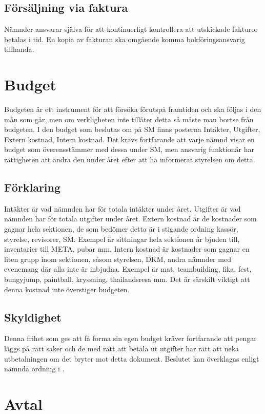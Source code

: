 \documentclass{dgovdoc}
\begin{document}
\subsection{Försäljning via faktura}
Nämnder ansvarar själva för att kontinuerligt kontrollera att utskickade fakturor betalas i tid. En kopia av
fakturan ska omgående komma bokföringsansvarig tillhanda.

\section{Budget}
Budgeten är ett instrument för att försöka förutspå framtiden och ska följas i den mån som går, men om verkligheten inte tillåter detta så måste man bortse från budgeten. I den budget som beslutas om på SM finns posterna Intäkter, Utgifter, Extern kostnad, Intern kostnad. Det krävs fortfarande att varje nämnd visar en budget som överensstämmer  med dessa under SM, men ansvarig funktionär har rättigheten att ändra den under året efter att ha informerat styrelsen om detta.

\subsection{Förklaring}
Intäkter är vad nämnden har för totala intäkter under året. Utgifter är vad nämnden har för totala utgifter under året. Extern kostnad är de kostnader som gagnar hela sektionen, de som bedömer detta är i stigande ordning kassör, styrelse, revisorer, SM. Exempel är sittningar hela sektionen är bjuden till, inventarier till META, pubar mm. Intern kostnad är kostnader som gagnar en liten grupp inom sektionen, såsom styrelsen, DKM, andra nämnder med evenemang där alla inte är inbjudna. Exempel är mat, teambuilding, fika, fest, bungyjump, paintball, kryssning, thailandsresa mm. Det är särskilt viktigt att denna kostnad inte överstiger budgeten.

\subsection{Skyldighet}
Denna frihet som ges att få forma sin egen budget kräver fortfarande att pengar läggs på rätt saker och de med rätt att betala ut utgifter har rätt att neka utbetalningen om det bryter mot detta dokument. Beslutet kan överklagas enligt nämnda ordning i .

\section{Avtal}
\end{document}
